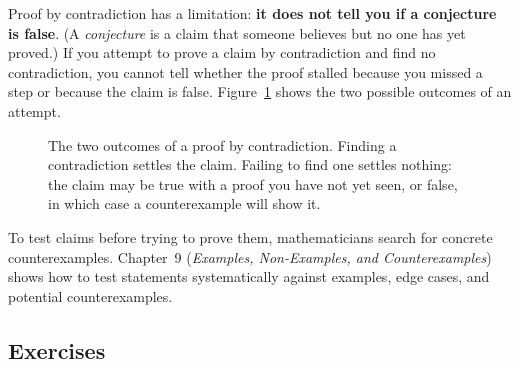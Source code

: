 Proof by contradiction has a limitation: \textbf{it does not tell you if a conjecture is false}. (A \emph{conjecture} is a claim that someone believes but no one has yet proved.) If you attempt to prove a claim by contradiction and find no contradiction, you cannot tell whether the proof stalled because you missed a step or because the claim is false. Figure~\ref{08:fig-stalled-attempt} shows the two possible outcomes of an attempt.

\begin{figure}[htbp]
\centering
{}
\caption{The two outcomes of a proof by contradiction. Finding a contradiction settles the claim. Failing to find one settles nothing: the claim may be true with a proof you have not yet seen, or false, in which case a counterexample will show it.}
\label{08:fig-stalled-attempt}
\end{figure}

To test claims before trying to prove them, mathematicians search for concrete counterexamples. Chapter~9 (\emph{Examples, Non-Examples, and Counterexamples}) shows how to test statements systematically against examples, edge cases, and potential counterexamples.

\subsection{Exercises}

